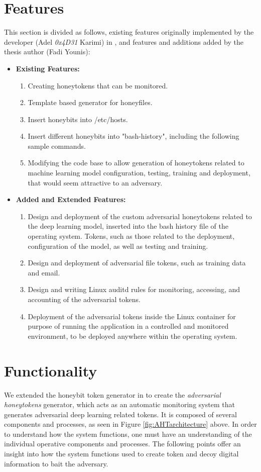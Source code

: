 \documentclass[grad,lot,lof,11pt,oneside,onehalfspace]{RUthesis}
\begin{document}
\section{Features}
This section is divided as follows, existing features originally implemented by the developer (Adel \textit{0x4D31} Karimi) in \cite{ka_honeybits:_2018}, and features and additions added by the thesis author (Fadi Younis):
\begin{itemize}
	\item \textbf{Existing Features:}
	\begin{enumerate}
			\item Creating honeytokens that can be monitored.
			\item Template based generator for honeyfiles.
			\item Insert honeybits into /etc/hosts.
			\item Insert different honeybits into "bash-history", including the following sample commands.
			\item Modifying the code base to allow generation of honeytokens related to machine learning model configuration, testing, training and deployment, that would seem attractive to an adversary.
	\end{enumerate}
	\item \textbf{Added and Extended Features:}
		\begin{enumerate}
			\item  Design and deployment of the custom adversarial honeytokens related to the deep learning model, inserted into the bash history file of the operating system. Tokens, such as those related to the deployment, configuration of the model, as well as testing and training. 
			\item Design and deployment of adversarial file tokens, such as training data and email. 
			\item  Design and writing Linux auditd rules for monitoring, accessing, and accounting of the adversarial tokens. 
            \item Deployment of the adversarial tokens inside the Linux container for purpose of running the application in a controlled and monitored environment, to be deployed anywhere within the operating system.
		\end{enumerate}
\end{itemize}
\section{Functionality}
We extended the honeybit token generator in \cite{ka_honeybits:_2018} to create the \textit{adversarial honeytokens} generator, which acts as an automatic monitoring
system that generates adversarial deep learning related tokens. It is composed of several components and processes, as seen in Figure \ref{fig:AHTarchitecture} above. In order to understand how the system functions, one must have an understanding of the individual operative components and processes. The following points offer an insight into how the system functions used to create token and decoy digital information to bait the adversary. 
\end{document}
